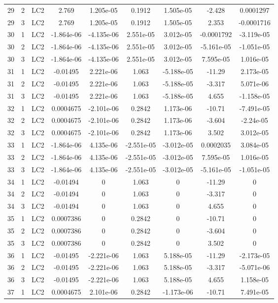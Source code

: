\documentclass{article}%
\begin{document}
\begin{longtable}{| c c c | c c c c c c |}
29&2&LC2&2.769&1.205e{-}05&0.1912&1.505e{-}05&{-}2.428&0.0001297\\%
29&3&LC2&2.769&1.205e{-}05&0.1912&1.505e{-}05&2.353&{-}0.0001716\\%
30&1&LC2&{-}1.864e{-}06&{-}4.135e{-}06&2.551e{-}05&3.012e{-}05&{-}0.0001792&{-}3.119e{-}05\\%
30&2&LC2&{-}1.864e{-}06&{-}4.135e{-}06&2.551e{-}05&3.012e{-}05&{-}5.161e{-}05&{-}1.051e{-}05\\%
30&3&LC2&{-}1.864e{-}06&{-}4.135e{-}06&2.551e{-}05&3.012e{-}05&7.595e{-}05&1.016e{-}05\\%
31&1&LC2&{-}0.01495&2.221e{-}06&1.063&{-}5.188e{-}05&{-}11.29&2.173e{-}05\\%
31&2&LC2&{-}0.01495&2.221e{-}06&1.063&{-}5.188e{-}05&{-}3.317&5.071e{-}06\\%
31&3&LC2&{-}0.01495&2.221e{-}06&1.063&{-}5.188e{-}05&4.655&{-}1.158e{-}05\\%
32&1&LC2&0.0004675&{-}2.101e{-}06&0.2842&1.173e{-}06&{-}10.71&{-}7.491e{-}05\\%
32&2&LC2&0.0004675&{-}2.101e{-}06&0.2842&1.173e{-}06&{-}3.604&{-}2.24e{-}05\\%
32&3&LC2&0.0004675&{-}2.101e{-}06&0.2842&1.173e{-}06&3.502&3.012e{-}05\\%
33&1&LC2&{-}1.864e{-}06&4.135e{-}06&{-}2.551e{-}05&{-}3.012e{-}05&0.0002035&3.084e{-}05\\%
33&2&LC2&{-}1.864e{-}06&4.135e{-}06&{-}2.551e{-}05&{-}3.012e{-}05&7.595e{-}05&1.016e{-}05\\%
33&3&LC2&{-}1.864e{-}06&4.135e{-}06&{-}2.551e{-}05&{-}3.012e{-}05&{-}5.161e{-}05&{-}1.051e{-}05\\%
34&1&LC2&{-}0.01494&0&1.063&0&{-}11.29&0\\%
34&2&LC2&{-}0.01494&0&1.063&0&{-}3.317&0\\%
34&3&LC2&{-}0.01494&0&1.063&0&4.655&0\\%
35&1&LC2&0.0007386&0&0.2842&0&{-}10.71&0\\%
35&2&LC2&0.0007386&0&0.2842&0&{-}3.604&0\\%
35&3&LC2&0.0007386&0&0.2842&0&3.502&0\\%
36&1&LC2&{-}0.01495&{-}2.221e{-}06&1.063&5.188e{-}05&{-}11.29&{-}2.173e{-}05\\%
36&2&LC2&{-}0.01495&{-}2.221e{-}06&1.063&5.188e{-}05&{-}3.317&{-}5.071e{-}06\\%
36&3&LC2&{-}0.01495&{-}2.221e{-}06&1.063&5.188e{-}05&4.655&1.158e{-}05\\%
37&1&LC2&0.0004675&2.101e{-}06&0.2842&{-}1.173e{-}06&{-}10.71&7.491e{-}05\\%

\end{longtable}
\end{document}
